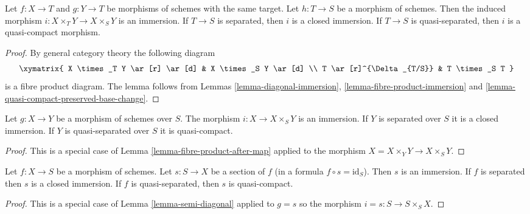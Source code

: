 \begin{lemma}
\label{lemma-fibre-product-after-map}
Let $f : X \to T$ and $g : Y \to T$ be morphisms of schemes
with the same target. Let $h : T \to S$ be a morphism of schemes.
Then the induced morphism $i : X \times_T Y \to X \times_S Y$ is
an immersion. If $T \to S$ is separated, then $i$ is a closed
immersion. If $T \to S$ is quasi-separated, then $i$ is a
quasi-compact morphism.
\end{lemma}

\begin{proof}
By general category theory the following diagram
$$
\xymatrix{
X \times_T Y \ar[r] \ar[d] & X \times_S Y \ar[d] \\
T \ar[r]^{\Delta_{T/S}} & T \times_S T
}
$$
is a fibre product diagram. The lemma follows
from Lemmas \ref{lemma-diagonal-immersion},
\ref{lemma-fibre-product-immersion} and
\ref{lemma-quasi-compact-preserved-base-change}.
\end{proof}

\begin{lemma}
\label{lemma-semi-diagonal}
\begin{reference}
\cite[Chapter II, \S 1, no. 35, p. 228]{FAC}
\end{reference}
Let $g : X \to Y$ be a morphism of schemes over $S$.
The morphism $i : X \to X \times_S Y$ is an immersion.
If $Y$ is separated over $S$ it is a closed immersion.
If $Y$ is quasi-separated over $S$ it is quasi-compact.
\end{lemma}

\begin{proof}
This is a special case of Lemma \ref{lemma-fibre-product-after-map}
applied to the morphism $X = X \times_Y Y \to X \times_S Y$.
\end{proof}

\begin{lemma}
\label{lemma-section-immersion}
Let $f : X \to S$ be a morphism of schemes.
Let $s : S \to X$ be a section of $f$ (in a formula $f \circ s = \text{id}_S$).
Then $s$ is an immersion.
If $f$ is separated then $s$ is a closed immersion.
If $f$ is quasi-separated, then $s$ is quasi-compact.
\end{lemma}

\begin{proof}
This is a special case of Lemma \ref{lemma-semi-diagonal} applied to
$g =s$ so the morphism $i = s : S \to S \times_S X$.
\end{proof}

